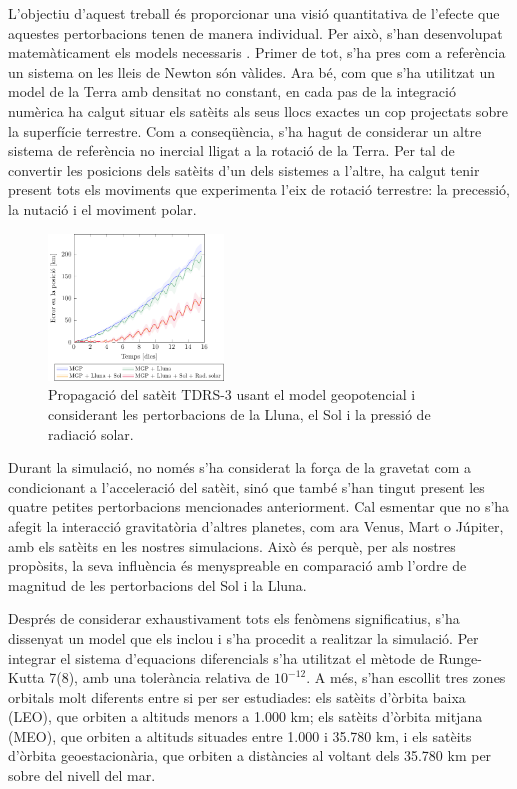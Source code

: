 \documentclass{article}
\begin{document}
L'objectiu d'aquest treball és proporcionar una visió quantitativa de l'efecte que aquestes pertorbacions tenen de manera individual. Per això, s'han desenvolupat matemàticament els models necessaris \cite{montenbruck,vallado}. Primer de tot, s'ha pres com a referència un sistema on les lleis de Newton són vàlides. Ara bé, com que s'ha utilitzat un model de la Terra amb densitat no constant, en cada pas de la integració numèrica ha calgut situar els satè\lgem its als seus llocs exactes un cop projectats sobre la superfície terrestre. Com a conseqüència, s'ha hagut de considerar un altre sistema de referència no inercial lligat a la rotació de la Terra. Per tal de convertir les posicions dels satè\lgem its d'un dels sistemes a l'altre, ha calgut tenir present tots els moviments que experimenta l'eix de rotació terrestre: la precessió, la nutació i el moviment polar.

\begin{figure}
  \vspace{-0.35cm}
  \centering
  \includegraphics[width=0.415\textwidth]{Images/simulation/TDRS-3-cat.pdf}
  \caption{Propagació del satè\lgem it TDRS-3 usant el model geopotencial i  considerant les pertorbacions de la Lluna, el Sol i la pressió de radiació solar.}
  \label{fig:TDRS}
\end{figure}
Durant la simulació, no només s'ha considerat la força de la gravetat com a condicionant a l'acceleració del satè\lgem it, sinó que també s'han tingut present les quatre petites pertorbacions mencionades anteriorment. Cal esmentar que no s'ha afegit la interacció gravitatòria d'altres planetes, com ara Venus, Mart o Júpiter, amb els satè\lgem its en les nostres simulacions. Això és perquè, per als nostres propòsits, la seva influència és menyspreable en comparació amb l'ordre de magnitud de les pertorbacions del Sol i la Lluna.

Després de considerar exhaustivament tots els fenòmens significatius, s'ha dissenyat un model que els inclou i s'ha procedit a realitzar la simulació. Per integrar el sistema d'equacions diferencials s'ha utilitzat el mètode de Runge-Kutta 7(8), amb una tolerància relativa de $10^{-12}$. A més, s'han escollit tres zones orbitals molt diferents entre si per ser estudiades: els satè\lgem its d'òrbita baixa (LEO), que orbiten a altituds menors a 1.000 km; els satè\lgem its d'òrbita mitjana (MEO), que orbiten a altituds situades entre 1.000 i 35.780 km, i els satè\lgem its d'òrbita geoestacionària, que orbiten a distàncies al voltant dels 35.780 km per sobre del nivell del mar.

\vspace{-0.2cm}
\printbibliography[title={Referències}]
\end{document}
